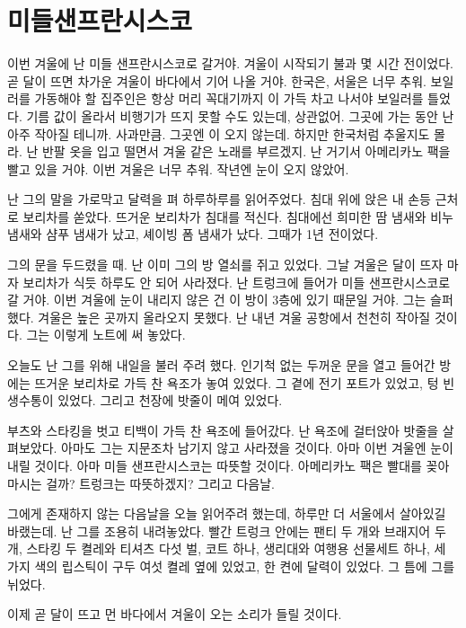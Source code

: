 \begin{article}
\hypertarget{uxbbf8uxb4e4uxc0ccuxd504uxb780uxc2dcuxc2a4uxcf54}{%
\chapter{미들샌프란시스코}\label{uxbbf8uxb4e4uxc0ccuxd504uxb780uxc2dcuxc2a4uxcf54}}

이번 겨울에 난 미들 샌프란시스코로 갈거야. 겨울이 시작되기 불과 몇 시간 전이었다. 곧 달이 뜨면 차가운 겨울이 바다에서 기어 나올 거야. 한국은, 서울은 너무 추워. 보일러를 가동해야 할 집주인은 항상 머리 꼭대기까지 이 가득 차고 나서야 보일러를 틀었다. 기름 값이 올라서 비행기가 뜨지 못할 수도 있는데, 상관없어. 그곳에 가는 동안 난 아주 작아질 테니까. 사과만큼. 그곳엔 이 오지 않는데. 하지만 한국처럼 추울지도 몰라. 난 반팔 옷을 입고 떨면서 겨울 같은 노래를 부르겠지. 난 거기서 아메리카노 팩을 빨고 있을 거야. 이번 겨울은 너무 추워. 작년엔 눈이 오지 않았어.

난 그의 말을 가로막고 달력을 펴 하루하루를 읽어주었다. 침대 위에 앉은 내 손등 근처로 보리차를 쏟았다. 뜨거운 보리차가 침대를 적신다. 침대에선 희미한 땀 냄새와 비누 냄새와 샴푸 냄새가 났고, 셰이빙 폼 냄새가 났다. 그때가 1년 전이었다.

그의 문을 두드렸을 때. 난 이미 그의 방 열쇠를 쥐고 있었다. 그날 겨울은 달이 뜨자 마자 보리차가 식듯 하루도 안 되어 사라졌다. 난 트렁크에 들어가 미들 샌프란시스코로 갈 거야. 이번 겨울에 눈이 내리지 않은 건 이 방이 3층에 있기 때문일 거야. 그는 슬퍼했다. 겨울은 높은 곳까지 올라오지 못했다. 난 내년 겨울 공항에서 천천히 작아질 것이다. 그는 이렇게 노트에 써 놓았다.

오늘도 난 그를 위해 내일을 불러 주려 했다. 인기척 없는 두꺼운 문을 열고 들어간 방에는 뜨거운 보리차로 가득 찬 욕조가 놓여 있었다. 그 곁에 전기 포트가 있었고, 텅 빈 생수통이 있었다. 그리고 천장에 밧줄이 메여 있었다.

부츠와 스타킹을 벗고 티백이 가득 찬 욕조에 들어갔다. 난 욕조에 걸터앉아 밧줄을 살펴보았다. 아마도 그는 지문조차 남기지 않고 사라졌을 것이다. 아마 이번 겨울엔 눈이 내릴 것이다. 아마 미들 샌프란시스코는 따뜻할 것이다. 아메리카노 팩은 빨대를 꽂아 마시는 걸까? 트렁크는 따뜻하겠지? 그리고 다음날.

그에게 존재하지 않는 다음날을 오늘 읽어주려 했는데, 하루만 더 서울에서 살아있길 바랬는데. 난 그를 조용히 내려놓았다. 빨간 트렁크 안에는 팬티 두 개와 브래지어 두 개, 스타킹 두 켤레와 티셔츠 다섯 벌, 코트 하나, 생리대와 여행용 선물세트 하나, 세 가지 색의 립스틱이 구두 여섯 켤레 옆에 있었고, 한 켠에 달력이 있었다. 그 틈에 그를 뉘었다.

이제 곧 달이 뜨고 먼 바다에서 겨울이 오는 소리가 들릴 것이다.
\end{article}
